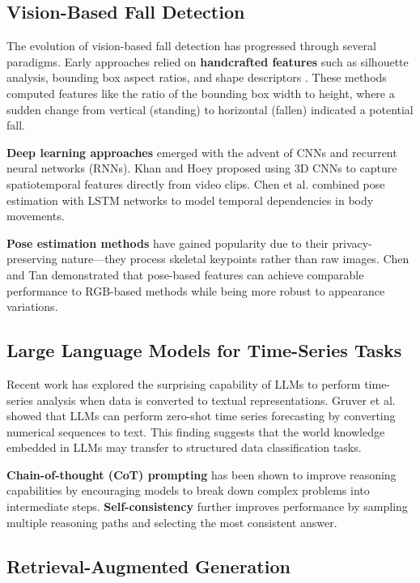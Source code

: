 \documentclass[conference]{IEEEtran}
\begin{document}
\subsection{Vision-Based Fall Detection}

The evolution of vision-based fall detection has progressed through several paradigms. Early approaches relied on \textbf{handcrafted features} such as silhouette analysis, bounding box aspect ratios, and shape descriptors \cite{rougier2011robust}. These methods computed features like the ratio of the bounding box width to height, where a sudden change from vertical (standing) to horizontal (fallen) indicated a potential fall.

\textbf{Deep learning approaches} emerged with the advent of CNNs and recurrent neural networks (RNNs). Khan and Hoey \cite{khan2020fall} proposed using 3D CNNs to capture spatiotemporal features directly from video clips. Chen et al. \cite{chen2020fall} combined pose estimation with LSTM networks to model temporal dependencies in body movements.

\textbf{Pose estimation methods} have gained popularity due to their privacy-preserving nature—they process skeletal keypoints rather than raw images. Chen and Tan \cite{chen2020pose} demonstrated that pose-based features can achieve comparable performance to RGB-based methods while being more robust to appearance variations.

\subsection{Large Language Models for Time-Series Tasks}

Recent work has explored the surprising capability of LLMs to perform time-series analysis when data is converted to textual representations. Gruver et al. \cite{gruver2023large} showed that LLMs can perform zero-shot time series forecasting by converting numerical sequences to text. This finding suggests that the world knowledge embedded in LLMs may transfer to structured data classification tasks.

\textbf{Chain-of-thought (CoT) prompting} \cite{wei2022chain} has been shown to improve reasoning capabilities by encouraging models to break down complex problems into intermediate steps. \textbf{Self-consistency} \cite{wang2022selfconsistency} further improves performance by sampling multiple reasoning paths and selecting the most consistent answer.

\subsection{Retrieval-Augmented Generation}
\end{document}

